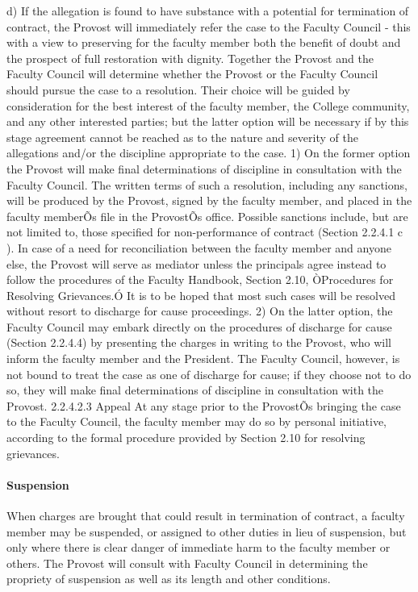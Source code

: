 \documentclass[letterpaper, 11pt]{article}
\begin{document}
				d) If the allegation is found to have substance with a potential for termination of contract, the Provost will immediately refer the case to the Faculty Council - this with a view to preserving for the faculty member both the benefit of doubt and the prospect of full restoration with dignity.  Together the Provost and the Faculty Council will determine whether the Provost or the Faculty Council should pursue the case to a resolution.  Their choice will be guided by consideration for the best interest of the faculty member, the College community, and any other interested parties; but the latter option will be necessary if by this stage agreement cannot be reached as to the nature and severity of the allegations and/or the discipline appropriate to the case.
				1) On the former option the Provost will make final determinations of discipline in consultation with the Faculty Council.  The written terms of such a resolution, including any sanctions, will be produced by the Provost, signed by the faculty member, and placed in the faculty memberÕs file in the ProvostÕs office.  Possible sanctions include, but are not limited to, those specified for non-performance of contract (Section 2.2.4.1 c ).  In case of a need for reconciliation between the faculty member and anyone else, the Provost will serve as mediator unless the principals agree instead to follow the procedures of the Faculty Handbook, Section 2.10, ÒProcedures for Resolving Grievances.Ó  It is to be hoped that most such cases will be resolved without resort to discharge for cause proceedings.
				2) On the latter option, the Faculty Council may embark directly on the procedures of discharge for cause (Section 2.2.4.4) by presenting the charges in writing to the Provost, who will inform the faculty member and the President.  The Faculty Council, however, is not bound to treat the case as one of discharge for cause; if they choose not to do so, they will make final determinations of discipline in consultation with the Provost.
				2.2.4.2.3 Appeal
				At any stage prior to the ProvostÕs bringing the case to the Faculty Council, the faculty member may do so by personal initiative, according to the formal procedure provided by Section 2.10 for resolving grievances.
			\paragraph{Suspension}
				When charges are brought that could result in termination of contract, a faculty member may be suspended, or assigned to other duties in lieu of suspension, but only where there is clear danger of immediate harm to the faculty member or others.  The Provost will consult with Faculty Council in determining the propriety of suspension as well as its length and other conditions.
\end{document}
